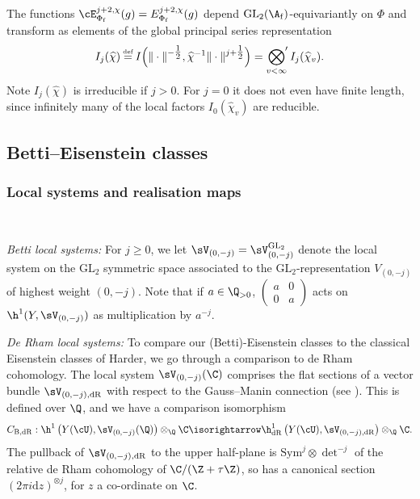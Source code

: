 \documentclass[10pt,reqno,a4paper]{amsart}
\newcommand{\stbt}[4]{\left(\begin{smallmatrix}#1 & #2\\#3&#4\end{smallmatrix}\right)}
\newcommand{\Phif}{{\Phi\subf}}
\newcommand{\LSk}{\sV_{(0,-j)}^{\GL_2}}
\newcommand{\LSkn}{\sV_{(0,-j)}}
\newcommand{\chihat}{\widehat{\chi}}
\newcommand{\subf}{_{\mathrm{f}}}
\newcommand{\GL}{\mathrm{GL}}
\begin{document}
\begin{remark}
The functions $\cE_{\Phif}^{j+2,\chi}(g) = E_{\Phif}^{j+2,\chi}(g)$ depend $\GL_2(\A\subf)$-equivariantly on $\Phi$ and transform as elements of the global principal series representation
\begin{equation}\label{eq:I_j(chi)}
	I_j(\chihat) \defeq I\Big(\|\cdot\|^{-\tfrac{1}{2}}, \chihat^{-1}\|\cdot\|^{j+\tfrac{1}{2}}\Big) = \sideset{}{'}\bigotimes_{v < \infty} I_j(\chihat_v).
\end{equation}
Note $I_j(\chihat)$ is irreducible if $j > 0$. For $j = 0$ it does not even have finite length, since infinitely many of the local factors $I_0(\widehat\chi_v)$ are reducible.
\end{remark}

\subsection{Betti--Eisenstein classes}\label{sec:Betti-Eisenstein}
\subsubsection{Local systems and realisation maps}$\qquad$

\emph{Betti local systems:}
For $j \ge 0$, we let $\LSkn = \LSk$ denote the local system on the $\GL_2$ symmetric space associated to the $\GL_2$-representation $V_{(0,-j)}$ of highest weight $(0, -j)$. Note that if $a \in \Q_{> 0}$, $\stbt a 0 0 a$ acts on $\h^1(Y, \LSkn)$ as multiplication by $a^{-j}$.

\emph{De Rham local systems:} \label{sec:dR}To compare our (Betti)-Eisenstein classes to the classical Eisenstein classes of Harder, we go through a comparison to de Rham cohomology. The local system $\LSkn(\C)$ comprises the flat sections of a vector bundle $\sV_{(0,-j),\mathrm{dR}}$ with respect to the Gauss--Manin connection (see \cite[\S 1.18]{pink90}). This is defined over $\Q$, and we have a comparison isomorphism
\begin{equation}\label{eq:betti de Rham comparison}
C_{\mathrm{B,dR}} : \h^1\left(Y(\cU), \LSkn(\Q)\right) \otimes_{\Q} \C \isorightarrow \h^1_{\mathrm{dR}}\left(Y(\cU), \sV_{(0,-j),\mathrm{dR}}\right) \otimes_{\Q}\C.
\end{equation}
The pullback of $\sV_{(0,-j),\mathrm{dR}}$ to the upper half-plane is $\mathrm{Sym}^j\otimes \det^{-j}$ of the relative de Rham cohomology of $\C/(\Z+\tau\Z)$, so has a canonical section $(2 \pi i \mathrm{d}z)^{\otimes j}$, for $z$ a co-ordinate on $\C$.
\end{document}
